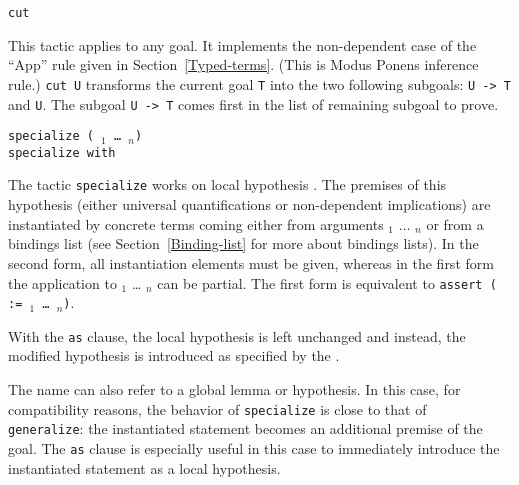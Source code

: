 \begin{coq_example*}
\begin{Variants}
\item {\tt cut {\form}}

  This tactic applies to any goal. It implements the non-dependent
  case of the ``App'' rule given in
  Section~\ref{Typed-terms}. (This is Modus Ponens inference rule.)
  {\tt cut U} transforms the current goal \texttt{T} into the two
  following subgoals: {\tt U -> T} and \texttt{U}.  The subgoal {\tt U
    -> T} comes first in the list of remaining subgoal to prove.

\item {\tt specialize ({\ident} \term$_1$ \dots\ \term$_n$) }\\
      {\tt specialize {\ident} with {\bindinglist} }

      The tactic {\tt specialize} works on local hypothesis \ident.
      The premises of this hypothesis (either universal
      quantifications or non-dependent implications) are instantiated
      by concrete terms coming either from arguments \term$_1$
      $\ldots$ \term$_n$ or from a bindings list (see
      Section~\ref{Binding-list} for more about bindings lists). In the
      second form, all instantiation elements must be given, whereas
      in the first form the application to \term$_1$ {\ldots}
      \term$_n$ can be partial. The first form is equivalent to
      {\tt assert ({\ident} := {\ident} {\term$_1$} \dots\ \term$_n$)}.

      With the {\tt as} clause, the local hypothesis {\ident} is left
      unchanged and instead, the modified hypothesis is introduced as
      specified by the {\intropattern}.

      The name {\ident} can also refer to a global lemma or
      hypothesis. In this case, for compatibility reasons, the
      behavior of {\tt specialize} is close to that of {\tt
        generalize}: the instantiated statement becomes an additional
      premise of the goal. The {\tt as} clause is especially useful
      in this case to immediately introduce the instantiated statement
      as a local hypothesis.

  \begin{ErrMsgs}
  \item {}
  \item {}
  \end{ErrMsgs}


\end{Variants}
\end{coq_example*}
